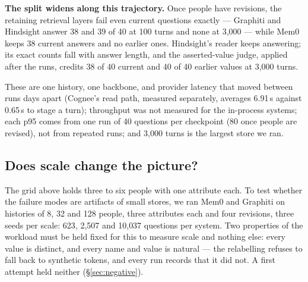 \documentclass[conference]{IEEEtran}
\begin{document}
\textbf{The split widens along this trajectory.} Once people have revisions, the
retaining retrieval layers fail even current questions exactly --- Graphiti and
Hindsight answer 38 and 39 of 40 at 100 turns and none at 3{,}000 --- while Mem0
keeps 38 current answers and no earlier ones. Hindsight's reader keeps
answering; its exact counts fall with answer length, and the asserted-value
judge, applied after the runs, credits 38 of 40 current and 40 of 40 earlier
values at 3{,}000 turns.

These are one history, one backbone, and provider latency that moved between
runs days apart (Cognee's read path, measured separately, averages 6.91\,s
against 0.65\,s to stage a turn); throughput was not measured for the
in-process systems; each p95 comes from one run of 40 questions per checkpoint
(80 once people are revised), not from repeated runs; and 3{,}000 turns is the
largest store we ran.

\subsection{Does scale change the picture?}\label{sec:scale}

The grid above holds three to six people with one attribute each. To test
whether the failure modes are artifacts of small stores, we ran Mem0 and
Graphiti on histories of 8, 32 and 128 people, three attributes each and four
revisions, three seeds per scale: 623, 2{,}507 and 10{,}037 questions per
system. Two properties of the workload must be held fixed for this to measure
scale and nothing else: every value is distinct, and every name and value is
natural --- the relabelling refuses to fall back to synthetic tokens, and every
run records that it did not. A first attempt held neither
(\S\ref{sec:negative}).
\end{document}

